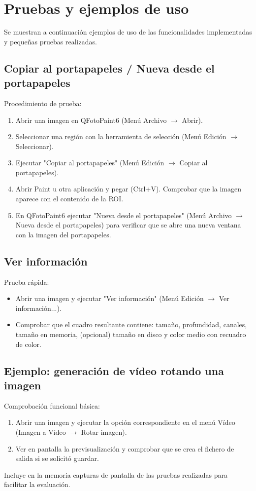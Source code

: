 \section{Pruebas y ejemplos de uso}

Se muestran a continuación ejemplos de uso de las funcionalidades implementadas y pequeñas pruebas realizadas.

\subsection{Copiar al portapapeles / Nueva desde el portapapeles}

Procedimiento de prueba:
\begin{enumerate}
\item Abrir una imagen en QFotoPaint6 (Menú Archivo $\to$ Abrir).
\item Seleccionar una región con la herramienta de selección (Menú Edición $\to$ Seleccionar).
\item Ejecutar "Copiar al portapapeles" (Menú Edición $\to$ Copiar al portapapeles).
\item Abrir Paint u otra aplicación y pegar (Ctrl+V). Comprobar que la imagen aparece con el contenido de la ROI.
\item En QFotoPaint6 ejecutar "Nueva desde el portapapeles" (Menú Archivo $\to$ Nueva desde el portapapeles) para verificar que se abre una nueva ventana con la imagen del portapapeles.
\end{enumerate}

\subsection{Ver información}

Prueba rápida:
\begin{itemize}
\item Abrir una imagen y ejecutar "Ver información" (Menú Edición $\to$ Ver información...).
\item Comprobar que el cuadro resultante contiene: tamaño, profundidad, canales, tamaño en memoria, (opcional) tamaño en disco y color medio con recuadro de color.
\end{itemize}

\subsection{Ejemplo: generación de vídeo rotando una imagen}

Comprobación funcional básica:
\begin{enumerate}
\item Abrir una imagen y ejecutar la opción correspondiente en el menú Vídeo (Imagen a Vídeo $\to$ Rotar imagen).
\item Ver en pantalla la previsualización y comprobar que se crea el fichero de salida si se solicitó guardar.
\end{enumerate}

Incluye en la memoria capturas de pantalla de las pruebas realizadas para facilitar la evaluación.
